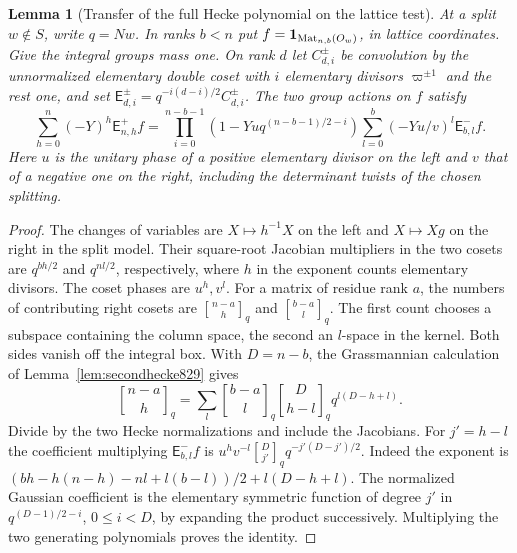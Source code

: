 \documentclass[a4paper,11pt]{article}
\newtheorem{lemma}[proposition]{Lemma}
\theoremstyle{definition}
\theoremstyle{remark}
\numberwithin{equation}{section}
\begin{document}
\begin{lemma}[Transfer of the full Hecke polynomial on the lattice test]
\leavevmode\label{lem:rectangularpolynomial848}
At a split \(w\notin S\), write \(q=Nw\). In ranks \(b<n\)
put \(f={\bf1}_{\operatorname{Mat}_{n,b}(O_w)}\), in lattice
coordinates. Give the integral groups mass one. On rank \(d\)
let \(C_{d,i}^{\pm}\) be convolution by the unnormalized
elementary double coset with \(i\) elementary divisors
\(\varpi^{\pm1}\) and the rest one, and set
\(\mathsf E_{d,i}^{\pm}=q^{-i(d-i)/2}C_{d,i}^{\pm}\).
The two group actions on \(f\) satisfy
\[
 \sum_{h=0}^n(-Y)^h\mathsf E_{n,h}^{+} f
 =
 \prod_{i=0}^{n-b-1}(1-Yu q^{(n-b-1)/2-i})
       \sum_{l=0}^b(-Yu/v)^l\mathsf E_{b,l}^{-} f .
\]
Here \(u\) is the unitary phase of a positive elementary
divisor on the left and \(v\) that of a negative one on the
right, including the determinant twists of the chosen splitting.
\end{lemma}
\begin{proof}
The changes of variables are \(X\mapsto h^{-1}X\) on the left
and \(X\mapsto Xg\) on the right in the split model. Their
square-root Jacobian multipliers in the two cosets are
\(q^{bh/2}\) and \(q^{nl/2}\), respectively, where \(h\) in
the exponent counts elementary divisors. The coset phases are
\(u^h,v^l\). For a matrix of residue rank \(a\), the numbers of
contributing right cosets are
\({n-a\brack h}_q\) and \({b-a\brack l}_q\). The first count
chooses a subspace containing the column space, the second an
\(l\)-space in the kernel. Both sides vanish off the integral
box. With \(D=n-b\), the Grassmannian calculation of
Lemma~\ref{lem:secondhecke829} gives
\[
 {n-a\brack h}_q=\sum_l {b-a\brack l}_q {D\brack h-l}_q
                                       q^{l(D-h+l)} .
\]
Divide by the two Hecke normalizations and include the
Jacobians. For \(j'=h-l\) the coefficient multiplying
\(\mathsf E_{b,l}^{-} f\) is
\(u^h v^{-l}{D\brack j'}_q q^{-j'(D-j')/2}\).
Indeed the exponent is
\((bh-h(n-h)-nl+l(b-l))/2+l(D-h+l)\).
The normalized Gaussian coefficient is the elementary symmetric
function of degree \(j'\) in \(q^{(D-1)/2-i}\), \(0\le i<D\),
by expanding the product successively. Multiplying the two
generating polynomials proves the identity.
\end{proof}
\end{document}
